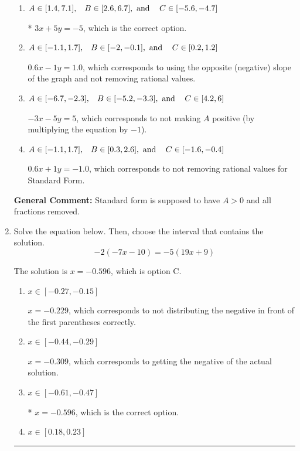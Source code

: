 \documentclass{extbook}[14pt]
\newcommand{\litem}[1]{\item #1

\rule{\textwidth}{0.4pt}}
\begin{document}
\begin{enumerate}
{\begin{enumerate}[label=\Alph*.]
 $3x - 5y = 5$, which corresponds to using the opposite (negative) slope of the graph, but did everything else correctly.
\item \( A \in [1.4, 7.1], \hspace{3mm} B \in [2.6, 6.7], \text{ and } \hspace{3mm} C \in [-5.6, -4.7] \)

* $3x + 5y = -5$, which is the correct option.
\item \( A \in [-1.1, 1.7], \hspace{3mm} B \in [-2, -0.1], \text{ and } \hspace{3mm} C \in [0.2, 1.2] \)

 $0.6x - 1y = 1.0$, which corresponds to using the opposite (negative) slope of the graph and not removing rational values.
\item \( A \in [-6.7, -2.3], \hspace{3mm} B \in [-5.2, -3.3], \text{ and } \hspace{3mm} C \in [4.2, 6] \)

 $-3x - 5y = 5$, which corresponds to not making $A$ positive (by multiplying the equation by $-1$).
\item \( A \in [-1.1, 1.7], \hspace{3mm} B \in [0.3, 2.6], \text{ and } \hspace{3mm} C \in [-1.6, -0.4] \)

 $0.6x + 1y = -1.0$, which corresponds to not removing rational values for Standard Form.
\end{enumerate}

\textbf{General Comment:} Standard form is supposed to have $A > 0$ and all fractions removed.
}
\litem{
Solve the equation below. Then, choose the interval that contains the solution.
\[ -2(-7x -10) = -5(19x + 9) \]

The solution is \( x = -0.596 \), which is option C.\begin{enumerate}[label=\Alph*.]
\item \( x \in [-0.27, -0.15] \)

$x = -0.229$, which corresponds to not distributing the negative in front of the first parentheses correctly.
\item \( x \in [-0.44, -0.29] \)

$x = -0.309$, which corresponds to getting the negative of the actual solution.
\item \( x \in [-0.61, -0.47] \)

* $x = -0.596$, which is the correct option.
\item \( x \in [0.18, 0.23] \)


\end{enumerate}}
\end{enumerate}
\end{document}
